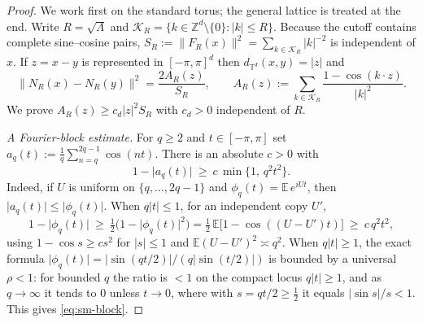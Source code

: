 \documentclass[11pt]{article}
\theoremstyle{remark}
\begin{document}
\begin{proof}
We work first on the standard torus; the general lattice is treated at the end.
Write $R=\sqrt\Lambda$ and $\mathcal K_R=\{k\in\mathbb Z^d\setminus\{0\}:\lvert k\rvert\le R\}$.
Because the cutoff contains complete sine--cosine pairs,
$S_R:=\lVert F_R(x)\rVert^2=\sum_{k\in\mathcal K_R}\lvert k\rvert^{-2}$ is
independent of $x$. If $z=x-y$ is represented in $[-\pi,\pi]^d$ then
$d_{\mathbb T^d}(x,y)=\lvert z\rvert$ and
\begin{equation}
\lVert N_R(x)-N_R(y)\rVert^2=\frac{2A_R(z)}{S_R},\qquad
A_R(z):=\sum_{k\in\mathcal K_R}\frac{1-\cos(k\cdot z)}{\lvert k\rvert^2}.
\label{eq:sm-N}
\end{equation}
We prove $A_R(z)\ge c_d\lvert z\rvert^2 S_R$ with $c_d>0$ independent of $R$.

\smallskip\noindent\emph{A Fourier-block estimate.} For $q\ge2$ and
$t\in[-\pi,\pi]$ set $a_q(t):=\tfrac1q\sum_{n=q}^{2q-1}\cos(nt)$. There is an
absolute $c>0$ with
\begin{equation}
1-\lvert a_q(t)\rvert\ \ge\ c\,\min\{1,\,q^2t^2\}.
\label{eq:sm-block}
\end{equation}
Indeed, if $U$ is uniform on $\{q,\dots,2q-1\}$ and $\phi_q(t)=\mathbb E\,e^{iUt}$,
then $\lvert a_q(t)\rvert\le\lvert\phi_q(t)\rvert$. When $q\lvert t\rvert\le1$, for an
independent copy $U'$,
\[
1-\lvert\phi_q(t)\rvert\ \ge\ \tfrac12\big(1-\lvert\phi_q(t)\rvert^2\big)
=\tfrac12\,\mathbb E\big[1-\cos((U-U')t)\big]\ \ge\ c\,q^2t^2,
\]
using $1-\cos s\ge cs^2$ for $\lvert s\rvert\le1$ and $\mathbb E(U-U')^2\asymp q^2$.
When $q\lvert t\rvert\ge1$, the exact formula
$\lvert\phi_q(t)\rvert=\lvert\sin(qt/2)\rvert/(q\lvert\sin(t/2)\rvert)$ is bounded by
a universal $\rho<1$: for bounded $q$ the ratio is $<1$ on the compact locus
$q\lvert t\rvert\ge1$, and as $q\to\infty$ it tends to $0$ unless $t\to0$, where with
$s=qt/2\ge\tfrac12$ it equals $\lvert\sin s\rvert/s<1$. This gives \eqref{eq:sm-block}.


\end{proof}
\end{document}
